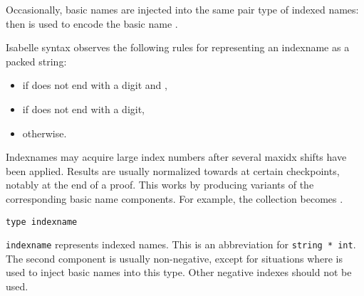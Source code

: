 \begin{isabellebody}
\begin{isamarkuptext}
  Occasionally, basic names are injected into the same pair type of
  indexed names: then  is used to encode the basic
  name .

  \medskip Isabelle syntax observes the following rules for
  representing an indexname  as a packed string:

  \begin{itemize}

  \item {} if  does not end with a digit and ,

  \item {} if  does not end with a digit,

  \item {} otherwise.

  \end{itemize}

  Indexnames may acquire large index numbers after several maxidx
  shifts have been applied.  Results are usually normalized towards
   at certain checkpoints, notably at the end of a proof.
  This works by producing variants of the corresponding basic name
  components.  For example, the collection 
  becomes .%
\end{isamarkuptext}%
\isamarkuptrue%
%
\isadelimmlref
%
\endisadelimmlref
%
\isatagmlref
%
\begin{isamarkuptext}%
\begin{mldecls}
  \verb|type indexname| \\
  \end{mldecls}

  \begin{description}

  \item \verb|indexname| represents indexed names.  This is an
  abbreviation for \verb|string * int|.  The second component is
  usually non-negative, except for situations where 
  is used to inject basic names into this type.  Other negative
  indexes should not be used.


\end{description}
\end{isamarkuptext}
\end{isabellebody}
